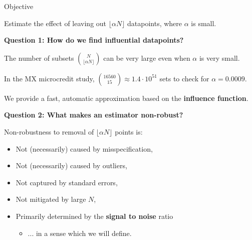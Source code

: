 \begin{frame}{Objective}

Estimate the effect of leaving out $\lfloor \alpha N \rfloor$ datapoints,
where $\alpha$ is small.
\pause

\vspace{1em}
\textbf{Question 1: How do we find influential datapoints?}

{
\small

The number of subsets ${N \choose \lfloor \alpha N \rfloor}$ can be very large
even when $\alpha$ is very small.

In the MX microcredit study, ${16560 \choose 15} \approx 1.4 \cdot 10^{51}$
sets to check for $\alpha = 0.0009$.

\pause
We provide a fast, automatic approximation based on the \textbf{influence function}.
}

\pause
\vspace{1em}
\textbf{Question 2: What makes an estimator non-robust?}

\pause
Non-robustness to removal of $\lfloor \alpha N \rfloor$ points is:
\vspace{-0.5em}
\begin{itemize}
    \item Not (necessarily) caused by misspecification,
    \item Not (necessarily) caused by outliers,
    \item Not captured by standard errors,
    \item Not mitigated by large $N$,
    \item Primarily determined by the \textbf{signal to noise} ratio
    \begin{itemize}
        \item[] ... in a sense which we will define.
    \end{itemize}
\end{itemize}


\end{frame}
